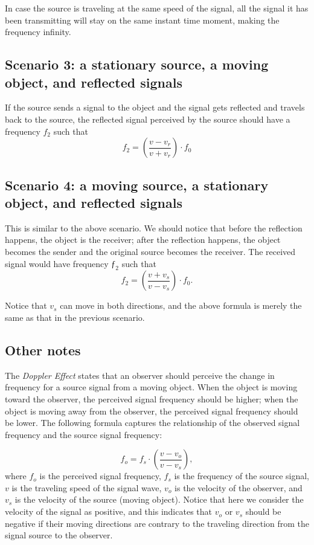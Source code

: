 \documentclass[11pt, oneside]{article}   	%
\begin{document}
In case the source is traveling at the same speed of the signal, all the signal it has been transmitting will stay on the same instant time moment, making the frequency infinity.

\subsection{Scenario 3: a stationary source, a moving object, and reflected signals}
If the source sends a signal to the object and the signal gets reflected and travels back to the source, the reflected signal perceived by the source should have a frequency $f_2$ such that 
$$f_2 = \left(\frac{v-v_r}{v+v_r}\right)\cdot f_0$$

\subsection{Scenario 4: a moving source, a stationary object, and reflected signals}
This is similar to the above scenario. We should notice that before the reflection happens, the object is the receiver; after the reflection happens, the object becomes the sender and the original source becomes the receiver.  The received signal would have frequency $ƒ_2$ such that
$$f_2 = \left(\frac{v+v_s}{v-v_s}\right)\cdot f_0.$$

Notice that $v_s$ can move in both directions, and the above formula is merely the same as that in the previous scenario.

\subsection{Other notes}


The \emph{Doppler Effect} states that an observer should perceive the change in frequency for a source signal from a moving object. When the object is moving toward the observer, the perceived signal frequency should be higher; when the object is moving away from the observer, the perceived signal frequency should be lower. The following formula captures the relationship of the observed signal frequency and the source signal frequency:


$$f_o = f_s \cdot \left(\frac{v - v_o}{v - v_s}\right), $$
where $f_o$ is the perceived signal frequency, $f_s$ is the frequency of the source signal, $v$ is the traveling speed of the signal wave, $v_o$ is the velocity of the observer, and $v_s$ is the velocity of the source (moving object). Notice that here we consider the velocity of the signal as positive, and this indicates that $v_o$ or $v_s$ should be negative if their moving directions are contrary to the traveling direction from the signal source to the observer.
\end{document}
